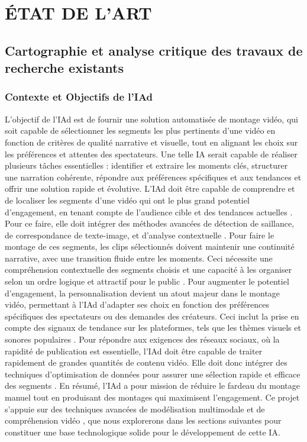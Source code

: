 \documentclass[livre]{udes-genie-these}
\begin{document}
\chapter{ÉTAT DE L'ART}

\section{Cartographie et analyse critique des travaux de recherche existants}
\subsection{Contexte et Objectifs de l'IAd}	
L'objectif de l'IAd est de fournir une solution automatisée de montage vidéo, qui soit capable de sélectionner les segments les plus pertinents d'une vidéo en fonction de critères de qualité narrative et visuelle, tout en alignant les choix sur les préférences et attentes des spectateurs. Une telle IA serait capable de réaliser plusieurs tâches essentielles : identifier et extraire les moments clés, structurer une narration cohérente, répondre aux préférences spécifiques et aux tendances et offrir une solution rapide et évolutive.
L'IAd doit être capable de comprendre et de localiser les segments d'une vidéo qui ont le plus grand potentiel d'engagement, en tenant compte de l'audience cible et des tendances actuelles \cite{bain2022}. Pour ce faire, elle doit intégrer des méthodes avancées de détection de saillance, de correspondance de texte-image, et d'analyse contextuelle \cite{weng2024}\cite{anonymous2023_bubogpt}. 
Pour faire le montage de ces segments, les clips sélectionnés doivent maintenir une continuité narrative, avec une transition fluide entre les moments. Ceci nécessite une compréhension contextuelle des segments choisis et une capacité à les organiser selon un ordre logique et attractif pour le public \cite{feng2023}\cite{munasinghe2023_pgvideo}. 
Pour augmenter le potentiel d'engagement, la personnalisation devient un atout majeur dans le montage vidéo, permettant à l'IAd d'adapter ses choix en fonction des préférences spécifiques des spectateurs ou des demandes des créateurs. Ceci inclut la prise en compte des signaux de tendance sur les plateformes, tels que les thèmes visuels et sonores populaires \cite{anonymous2023_valley}\cite{captions2024}. 
Pour répondre aux exigences des réseaux sociaux, où la rapidité de publication est essentielle, l'IAd doit être capable de traiter rapidement de grandes quantités de contenu vidéo. Elle doit donc intégrer des techniques d'optimisation de données pour assurer une sélection rapide et efficace des segments \cite{wang2024_hawkeye}\cite{wang2024_lave}. 
En résumé, l'IAd a pour mission de réduire le fardeau du montage manuel tout en produisant des montages qui maximisent l'engagement. Ce projet s'appuie sur des techniques avancées de modélisation multimodale et de compréhension vidéo \cite{zhang2023}\cite{tang2023}, que nous explorerons dans les sections suivantes pour constituer une base technologique solide pour le développement de cette IA.
\end{document}
